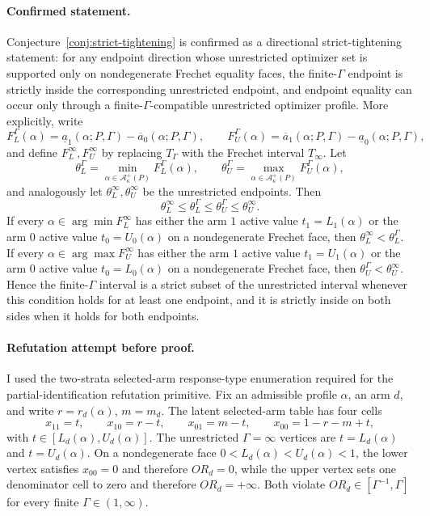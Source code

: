 \begin{theorem}
\paragraph{Confirmed statement.}
Conjecture~\ref{conj:strict-tightening} is confirmed as a directional strict-tightening statement: for any endpoint direction whose unrestricted optimizer set is supported only on nondegenerate Frechet equality faces, the finite-\(\Gamma\) endpoint is strictly inside the corresponding unrestricted endpoint, and endpoint equality can occur only through a finite-\(\Gamma\)-compatible unrestricted optimizer profile.
More explicitly, write
\[
  F_L^\Gamma(\alpha)=\underline a_1(\alpha;P,\Gamma)-\overline a_0(\alpha;P,\Gamma),
  \qquad
  F_U^\Gamma(\alpha)=\overline a_1(\alpha;P,\Gamma)-\underline a_0(\alpha;P,\Gamma),
\]
and define \(F_L^\infty,F_U^\infty\) by replacing \(T_\Gamma\) with the Frechet interval \(T_\infty\).  Let
\[
  \theta_L^\Gamma=\min_{\alpha\in\mathcal A_\kappa^+(P)}F_L^\Gamma(\alpha),
  \qquad
  \theta_U^\Gamma=\max_{\alpha\in\mathcal A_\kappa^+(P)}F_U^\Gamma(\alpha),
\]
and analogously let \(\theta_L^\infty,\theta_U^\infty\) be the unrestricted endpoints.  Then
\[
  \theta_L^\infty\le \theta_L^\Gamma\le \theta_U^\Gamma\le \theta_U^\infty.
\]
If every \(\alpha\in\arg\min F_L^\infty\) has either the arm \(1\) active value \(t_1=L_1(\alpha)\) or the arm \(0\) active value \(t_0=U_0(\alpha)\) on a nondegenerate Frechet face, then \(\theta_L^\infty<\theta_L^\Gamma\).  If every \(\alpha\in\arg\max F_U^\infty\) has either the arm \(1\) active value \(t_1=U_1(\alpha)\) or the arm \(0\) active value \(t_0=L_0(\alpha)\) on a nondegenerate Frechet face, then \(\theta_U^\Gamma<\theta_U^\infty\).  Hence the finite-\(\Gamma\) interval is a strict subset of the unrestricted interval whenever this condition holds for at least one endpoint, and it is strictly inside on both sides when it holds for both endpoints.
\end{theorem}

\paragraph{Refutation attempt before proof.}
I used the two-strata selected-arm response-type enumeration required for the partial-identification refutation primitive.  Fix an admissible profile \(\alpha\), an arm \(d\), and write \(r=r_d(\alpha)\), \(m=m_d\).  The latent selected-arm table has four cells
\[
  x_{11}=t,\qquad x_{10}=r-t,\qquad x_{01}=m-t,\qquad x_{00}=1-r-m+t,
\]
with \(t\in[L_d(\alpha),U_d(\alpha)]\).  The unrestricted \(\Gamma=\infty\) vertices are \(t=L_d(\alpha)\) and \(t=U_d(\alpha)\).  On a nondegenerate face \(0<L_d(\alpha)<U_d(\alpha)<1\), the lower vertex satisfies \(x_{00}=0\) and therefore \(OR_d=0\), while the upper vertex sets one denominator cell to zero and therefore \(OR_d=+\infty\).  Both violate \(OR_d\in[\Gamma^{-1},\Gamma]\) for every finite \(\Gamma\in(1,\infty)\).


